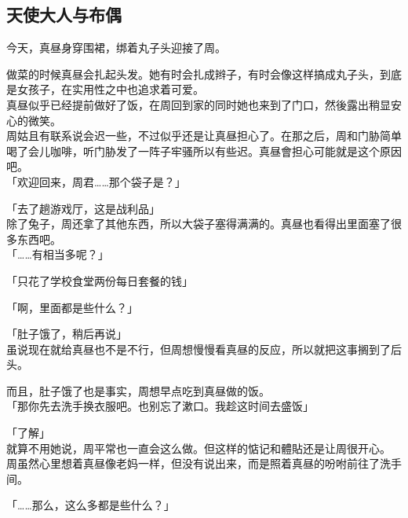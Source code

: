 \subsection{天使大人与布偶}

今天，真昼身穿围裙，绑着丸子头迎接了周。

做菜的时候真昼会扎起头发。她有时会扎成辫子，有时会像这样搞成丸子头，到底是女孩子，在实用性之中也追求着可爱。\\

真昼似乎已经提前做好了饭，在周回到家的同时她也来到了门口，然後露出稍显安心的微笑。\\

周姑且有联系说会迟一些，不过似乎还是让真昼担心了。在那之后，周和门胁简单喝了会儿咖啡，听门胁发了一阵子牢骚所以有些迟。真昼會担心可能就是这个原因吧。\\

「欢迎回来，周君……那个袋子是？」

「去了趟游戏厅，这是战利品」\\

除了兔子，周还拿了其他东西，所以大袋子塞得满满的。真昼也看得出里面塞了很多东西吧。\\

「……有相当多呢？」%

「只花了学校食堂两份每日套餐的钱」

「啊，里面都是些什么？」%

「肚子饿了，稍后再说」\\

虽说现在就给真昼也不是不行，但周想慢慢看真昼的反应，所以就把这事搁到了后头。

而且，肚子饿了也是事实，周想早点吃到真昼做的饭。\\

「那你先去洗手换衣服吧。也别忘了漱口。我趁这时间去盛饭」

「了解」\\

就算不用她说，周平常也一直会这么做。但这样的惦记和體貼还是让周很开心。\\

周虽然心里想着真昼像老妈一样，但没有说出来，而是照着真昼的吩咐前往了洗手间。\\

\vspace{2\baselineskip}

「……那么，这么多都是些什么？」\\

